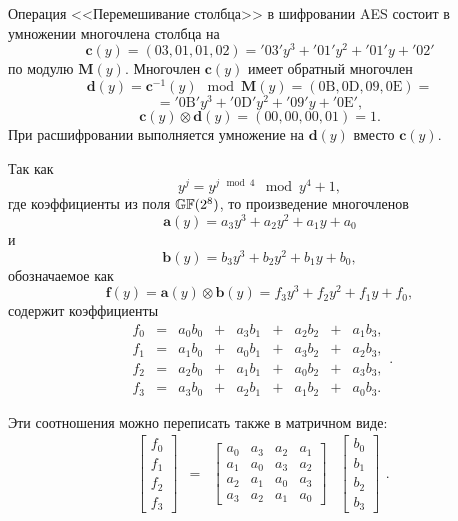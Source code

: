 Операция <<Перемешивание столбца>> в шифровании AES состоит в умножении многочлена столбца на
    \[ \mathbf{c}(y) = (03, 01, 01, 02) = \mathrm{'03'} y^3 + \mathrm{'01'} y^2 + \mathrm{'01'} y + \mathrm{'02'} \]
по модулю $\mathbf{M}(y)$. Многочлен $\mathbf{c}(y)$ имеет обратный многочлен
    \[ \mathbf{d}(y) = \mathbf{c}^{-1}(y) \mod \mathbf{M}(y) = (\mathrm{0B}, \mathrm{0D}, \mathrm{09}, \mathrm{0E}) = \]
        \[ = \mathrm{'0B'} y^3 + \mathrm{'0D'} y^2 + \mathrm{'09'} y + \mathrm{'0E'}, \]
    \[ \mathbf{c}(y) \otimes \mathbf{d}(y) = (00, 00, 00, 01) = 1. \]
При расшифровании выполняется умножение на $\mathbf{d}(y)$ вместо $\mathbf{c}(y)$.

Так как
    \[ y^j = y^{j \mod 4} \mod y^4+1, \]
где коэффициенты из поля $\mathbb{GF}(2^8)$, то произведение многочленов
    \[ \mathbf{a}(y) = a_{3}y^{3}+ a_{2}y^{2} + a_{1}y + a_{0} \]
и
    \[ \mathbf{b}(y) = b_{3}y^{3} + b_{2}y^{2} + b_{1}y + b_{0}, \]
обозначаемое как
    \[ \mathbf{f}(y) = \mathbf{a}(y) \otimes \mathbf{b}(y) = f_{3}y^{3} + f_{2}y^{2} + f_{1}y + f_{0}, \]
содержит коэффициенты
\[
    \begin{array}{ccccccccc}
        f_{0} & = & a_{0}b_{0} & + & a_{3}b_{1} & + & a_{2}b_{2} & + & a_{1}b_{3}, \\
        f_{1} & = & a_{1}b_{0} & + & a_{0}b_{1} & + & a_{3}b_{2} & + & a_{2}b_{3}, \\
        f_{2} & = & a_{2}b_{0} & + & a_{1}b_{1} & + & a_{0}b_{2} & + & a_{3}b_{3}, \\
        f_{3} & = & a_{3}b_{0} & + & a_{2}b_{1} & + & a_{1}b_{2} & + &  a_{0}b_{3}.
    \end{array}.
\]

Эти соотношения можно переписать также в матричном виде:
\[
    \begin{array}{cccc}
        \left[ \begin{array}{c}
            f_{0} \\
            f_{1} \\
            f_{2} \\
            f_{3}
        \end{array} \right] &  = & \left[\begin{array}{cccc}
            a_{0} & a_{3} & a_{2} & a_{1} \\
            a_{1} & a_{0} & a_{3} & a_{2} \\
            a_{2} & a_{1} & a_{0} & a_{3} \\
            a_{3} & a_{2} & a_{1} & a_{0}
        \end{array}\right] & \left[\begin{array}{c}
            b_{0} \\
            b_{1} \\
            b_{2} \\
            b_{3}
        \end{array} \right]
    \end{array}.
\]

